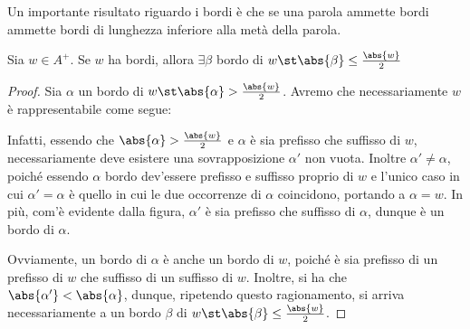 Un importante risultato riguardo i bordi è che se una parola ammette bordi ammette bordi di lunghezza inferiore alla metà della parola.

\begin{proposition}[label=prop:if_border_exists_border_half_length]{}
  Sia \(w \in A^+\). Se \(w\) ha bordi, allora \(\exists \beta\) bordo di \(w \st \abs{\beta}\leq\frac{\abs{w}}{2}\)
\end{proposition}

\begin{proof}
  Sia \(\alpha\) un bordo di \(w \st \abs{\alpha} > \frac{\abs{w}}{2}\).
  Avremo che necessariamente \(w\) è rappresentabile come segue:
  \begin{figure}[H]
    \centering
  \end{figure}
  Infatti, essendo che \(\abs{\alpha} > \frac{\abs{w}}{2}\) e \(\alpha\) è sia prefisso che suffisso di \(w\), necessariamente deve esistere una sovrapposizione \(\alpha'\) non vuota.
  Inoltre \(\alpha'\neq\alpha\), poiché essendo \(\alpha\) bordo dev'essere prefisso e suffisso proprio di \(w\) e l'unico caso in cui \(\alpha' = \alpha\) è quello in cui le due occorrenze di \(\alpha\) coincidono, portando a \(\alpha = w\).
  In più, com'è evidente dalla figura, \(\alpha'\) è sia prefisso che suffisso di \(\alpha\), dunque è un bordo di \(\alpha\).

  Ovviamente, un bordo di \(\alpha\) è anche un bordo di \(w\), poiché è sia prefisso di un prefisso di \(w\) che suffisso di un suffisso di \(w\).
  Inoltre, si ha che \(\abs{\alpha'} < \abs{\alpha}\), dunque, ripetendo questo ragionamento, si arriva necessariamente a un bordo \(\beta\) di \(w \st \abs{\beta} \leq \frac{\abs{w}}{2}\).
\end{proof}

